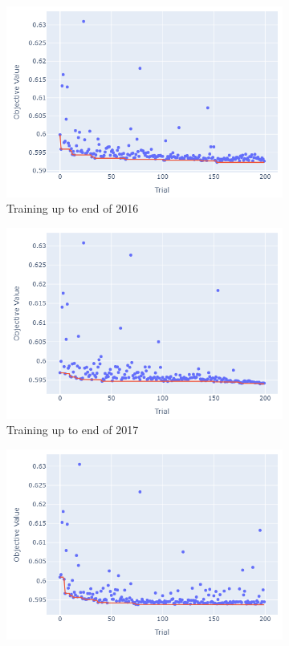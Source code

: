 \documentclass[12pt,twoside]{report}
\begin{document}
\begin{figure}[htb]
\centering
\captionsetup{justification=centering}
\begin{subfigure}{.33\linewidth}
  \centering
  \includegraphics[width=0.95\linewidth]{figures/lightgbm_cutoff_2016.png}
  \caption{Training up to end of 2016}
\end{subfigure}%
\begin{subfigure}{.33\linewidth}
  \centering
  \includegraphics[width=0.95\linewidth]{figures/lightgbm_cutoff_2017.png}
  \caption{Training up to end of 2017}
\end{subfigure}%
\begin{subfigure}{.33\linewidth}
  \centering
  \includegraphics[width=0.95\linewidth]{figures/lightgbm_cutoff_2018.png}

\end{subfigure}
\end{figure}
\end{document}
